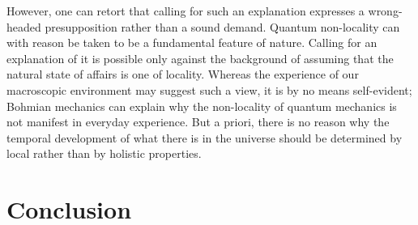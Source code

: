 \documentclass[12pt]{article}
\theoremstyle{definition}
\begin{document}
However, one can retort that calling for such an explanation expresses a wrong-headed presupposition rather than a sound demand. Quantum non-locality can with reason be taken to be a fundamental feature of nature. Calling for an explanation of it is possible only against the background of assuming that the natural state of affairs is one of locality. Whereas the experience of our macroscopic environment may suggest such a view, it is by no means self-evident; Bohmian mechanics can explain why the non-locality of quantum mechanics is not manifest in everyday experience. But a priori, there is no reason why the temporal development of what there is in the universe should be determined by local rather than by holistic properties.

\section{Conclusion}
\end{document}
